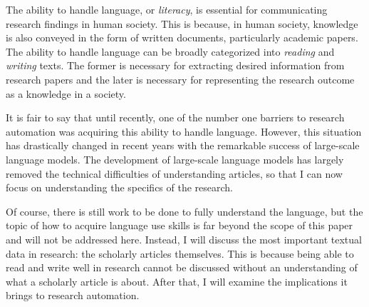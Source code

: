 \documentclass{article}
\begin{document}
The ability to handle language, or \textit{literacy}, is essential for communicating research findings in human society. This is because, in human society, knowledge is also conveyed in the form of written documents, particularly academic papers. The ability to handle language can be broadly categorized into \textit{reading} and \textit{writing} texts. The former is necessary for extracting desired information from research papers and the later is necessary for representing the research outcome as a knowledge in a society.

It is fair to say that until recently, one of the number one barriers to research automation was acquiring this ability to handle language. However, this situation has drastically changed in recent years with the remarkable success of large-scale language models. The development of large-scale language models has largely removed the technical difficulties of understanding articles, so that I can now focus on understanding the specifics of the research.

Of course, there is still work to be done to fully understand the language, but the topic of how to acquire language use skills is far beyond the scope of this paper and will not be addressed here. Instead, I will discuss the most important textual data in research: the scholarly articles themselves. This is because being able to read and write well in research cannot be discussed without an understanding of what a scholarly article is about. After that, I will examine the implications it brings to research automation.



\end{document}
